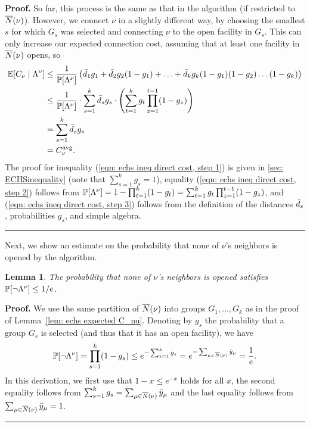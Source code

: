\documentclass[oneside,final]{ucr}
\newtheorem{lemma}[theorem]{Lemma}
\newenvironment{proof}[1][Proof]{\textbf{#1.} }{\ \rule{0.5em}{0.5em}}
\begin{document}
\begin{proof}
So far, this process is the same as that in the algorithm (if restricted to ${\overline{N}}(\nu)$).
However, we connect $\nu$ in a slightly different way, by choosing the smallest
$s$ for which $G_s$ was selected and connecting $\nu$ to the open facility in $G_s$.
This can only increase our expected connection cost, assuming that at least one
facility in ${\overline{N}}(\nu)$ opens, so
%
\begin{align}
  \mathbb{E}[C_\nu \mid \Lambda^\nu] &\leq \frac{1}{\mathbb{P}[\Lambda^\nu]}
  \left( {\bar d}_1 g_1 + {\bar d}_2 g_2 (1-g_1) + \ldots + {\bar d}_k g_k
    (1-g_1) (1-g_2) \ldots (1-g_k) \right)
			\notag
  \\
  &\leq \frac{1}{\mathbb{P}[\Lambda^\nu]}
	\cdot \sum_{s=1}^k {\bar d}_s g_s
	\cdot
		\left(\sum_{t=1}^k g_t \prod_{z=1}^{t-1} (1-g_z)\right)
			\label{eqn: echs ineq direct cost, step 1}
  \\
  &= \sum_{s=1}^k {\bar d}_s g_s
			\label{eqn: echs ineq direct cost, step 2}
	\\
			&= C^{{\mbox{\scriptsize\rm avg}}}_{\nu}.
				\label{eqn: echs ineq direct cost, step 3}
\end{align}
%
The proof for inequality (\ref{eqn: echs ineq direct cost, step 1}) 
is given in \ref{sec: ECHSinequality} (note that $\sum_{s=1}^k g_s = 1$),
equality (\ref{eqn: echs ineq direct cost, step 2}) follows from
$\mathbb{P}[\Lambda^\nu] = 1 - \prod_{t=1}^k (1-g_t)
					= \sum_{t=1}^k g_t
                                        \prod_{z=1}^{t-1} (1 - g_z)$,
and (\ref{eqn: echs ineq direct cost, step 3}) follows from the definition
of the distances ${\bar d}_s$, probabilities $g_s$, and simple algebra.
\end{proof}

Next, we show an estimate on the probability that none of $\nu$'s
neighbors is opened by the algorithm.

\begin{lemma}\label{lem: probability of not Lambda^nu}
The probability that none of $\nu$'s neighbors is opened satisfies
$\mathbb{P}[\neg\Lambda^\nu] \le 1/e$.
\end{lemma}
\begin{proof}
We use the same partition of ${\overline{N}}(\nu)$ into groups $G_1,...,G_k$ as
in the proof of Lemma~\ref{lem: echs expected C_nu}. Denoting by
$g_s$ the probability that a group $G_s$ is selected (and thus that it
has an open facility), we have
%
\begin{equation*}
\mathbb{P}[\neg\Lambda^\nu] = \prod_{s=1}^k (1 - g_s)
			\le e^{- \sum_{s=1}^k g_s}
			= e^{-\sum_{\mu \in {\overline{N}}(\nu)} {\bar y}_{\mu}}
			= \frac{1}{e}.
\end{equation*}
%
In this derivation, we first use that $1-x\le e^{-x}$ holds for all $x$,
the second equality follows from $\sum_{s=1}^k g_s = \sum_{\mu \in {\overline{N}}(\nu)} {\bar y}_{\mu}$
and the last equality follows from 
$\sum_{\mu \in {\overline{N}}(\nu)} {\bar y}_{\mu} = 1$.
\end{proof}
\end{document}
